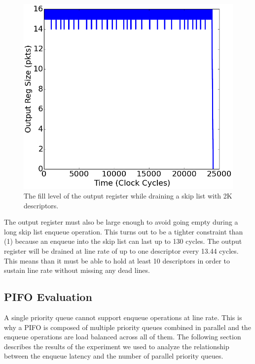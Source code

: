 \begin{figure}[!ht]
\includegraphics[width=1\linewidth]{figures/eval/out_reg_size}
\caption{The fill level of the output register while draining a skip list with 2K descriptors.}
\label{fig:out_reg_size}
\end{figure}

The output register must also be large enough to avoid going empty during a long skip list enqueue operation. This turns out to be a tighter constraint than (1) because an enqueue into the skip list can last up to 130 cycles. The output register will be drained at line rate of up to one descriptor every 13.44 cycles. This means than it must be able to hold at least 10 descriptors in order to sustain line rate without missing any dead lines.

\subsection{PIFO Evaluation}

A single priority queue cannot support enqueue operations at line rate. This is why a PIFO is composed of multiple priority queues combined in parallel and the enqueue operations are load balanced across all of them. The following section describes the results of the experiment we used to analyze the relationship between the enqueue latency and the number of parallel priority queues.

